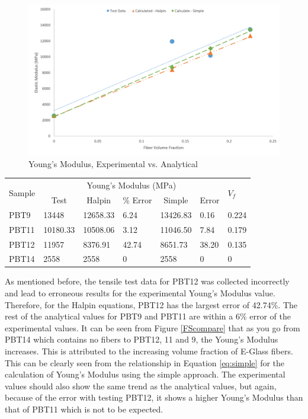 \documentclass[11pt]{article}
\begin{document}
\begin{figure}[H]
\centering
\includegraphics[width=.95\linewidth]{figures/modulus_test_vs_calc.png}
\caption{Young's Modulus, Experimental vs. Analytical}
\label{ModulusCompare}
\end{figure}

\begin{center}
 \label{tab:ComparingModulus}
\begin{tabular}{p{1.25cm} || p{1.5cm} | p{1.5cm} | p{1.5cm} | p{1.5cm} | p{1.5cm} | p{1.5cm}}
\hline
 \multirow{2}{*}{Sample} & \multicolumn{5}{c|}{Young's Modulus (MPa)} & \multirow{2}{*}{\(V_f\)} \\
   &  \multicolumn{1}{c}{Test} & \multicolumn{1}{c}{Halpin} & \multicolumn{1}{c}{\% Error} & \multicolumn{1}{c}{Simple} & \multicolumn{1}{c|}{ Error} \\
\hline
PBT9 & 13448 & 12658.33 & 6.24 & 13426.83 & 0.16 & 0.224\\
PBT11 & 10180.33 & 10508.06 & 3.12 & 11046.50 & 7.84 &  0.179\\
PBT12 & 11957 & 8376.91 & 42.74 & 8651.73 & 38.20 & 0.135 \\
PBT14 & 2558 & 2558 & 0 & 2558 & 0 & 0\\
\hline
\end{tabular}
\end{center}
\singlespacing

As mentioned before, the tensile test data for PBT12 was collected incorrectly and lead to erroneous results for the experimental Young's Modulus value. Therefore, for the Halpin equations, PBT12 has the largest error of 42.74\%. The rest of the analytical values for PBT9 and PBT11 are within a 6\% error of the experimental values. It can be seen from Figure \ref{FScompare} that as you go from PBT14 which contains no fibers to PBT12, 11 and  9, the Young's Modulus increases. This is attributed to the increasing volume fraction of E-Glass fibers. This can be clearly seen from the relationship in Equation \ref{eq:simple} for the calculation of Young's Modulus using the simple approach. The experimental values should also show the same trend as the analytical values, but again, because of the error with testing PBT12, it shows a higher Young's Modulus than that of PBT11 which is not to be expected. 
\end{document}
